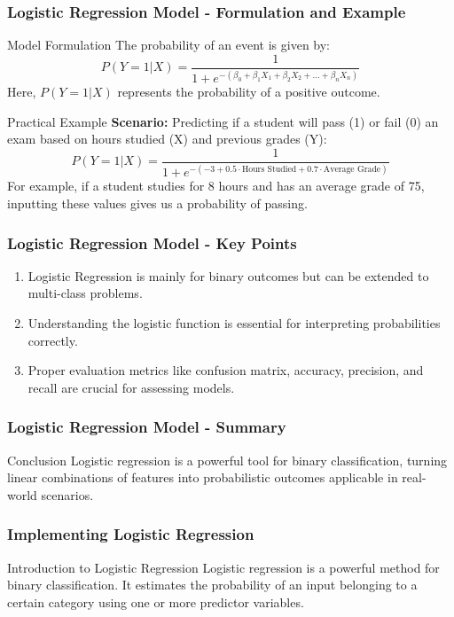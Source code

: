 \documentclass[aspectratio=169]{beamer}
\begin{document}
\begin{frame}[fragile]
    \frametitle{Logistic Regression Model - Formulation and Example}
    \begin{block}{Model Formulation}
        The probability of an event is given by:
        \begin{equation}
            P(Y=1 | X) = \frac{1}{1 + e^{-(\beta_0 + \beta_1 X_1 + \beta_2 X_2 + \ldots + \beta_n X_n)}}
        \end{equation}
        Here, \( P(Y=1 | X) \) represents the probability of a positive outcome.
    \end{block}
    \begin{block}{Practical Example}
        \textbf{Scenario:} Predicting if a student will pass (1) or fail (0) an exam based on hours studied (X) and previous grades (Y):
        \[
        P(Y=1 | X) = \frac{1}{1 + e^{-(-3 + 0.5 \cdot \text{Hours Studied} + 0.7 \cdot \text{Average Grade})}}
        \]
        For example, if a student studies for 8 hours and has an average grade of 75, inputting these values gives us a probability of passing.
    \end{block}
\end{frame}

\begin{frame}[fragile]
    \frametitle{Logistic Regression Model - Key Points}
    \begin{enumerate}
        \item Logistic Regression is mainly for binary outcomes but can be extended to multi-class problems.
        \item Understanding the logistic function is essential for interpreting probabilities correctly.
        \item Proper evaluation metrics like confusion matrix, accuracy, precision, and recall are crucial for assessing models.
    \end{enumerate}
\end{frame}

\begin{frame}[fragile]
    \frametitle{Logistic Regression Model - Summary}
    \begin{block}{Conclusion}
        Logistic regression is a powerful tool for binary classification, turning linear combinations of features into probabilistic outcomes applicable in real-world scenarios.
    \end{block}
\end{frame}

\begin{frame}
    \frametitle{Implementing Logistic Regression}
    \begin{block}{Introduction to Logistic Regression}
        Logistic regression is a powerful method for binary classification. It estimates the probability of an input belonging to a certain category using one or more predictor variables.
    \end{block}
\end{frame}
\end{document}
